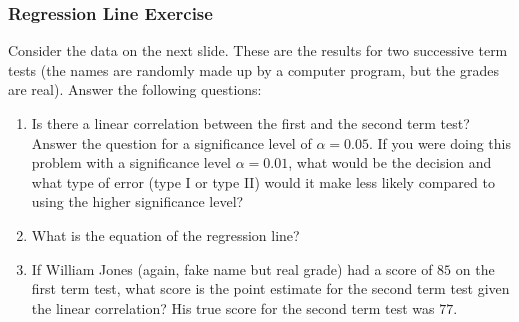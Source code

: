 \documentclass[xcolor=dvipsnames]{beamer}
\begin{document}
\begin{frame}
  \frametitle{Regression Line Exercise}
  {\ubung} Consider the data on the next slide. These are the
  results for two successive term tests (the names are randomly
  made up by a computer program, but the grades are real). Answer
  the following questions:
  \begin{enumerate}
  \item Is there a linear correlation between the first and the
    second term test? Answer the question for a significance level
    of $\alpha=0.05$. If you were doing this problem with a
    significance level $\alpha=0.01$, what would be the decision
    and what type of error (type I or type II) would it make less
    likely compared to using the higher significance level?
  \item What is the equation of the regression line?
  \item If William Jones (again, fake name but real grade) had a
    score of $85$ on the first term test, what score is the point
    estimate for the second term test given the linear
    correlation? His true score for the second term test was $77$.
  \end{enumerate}
\end{frame}
\end{document}
